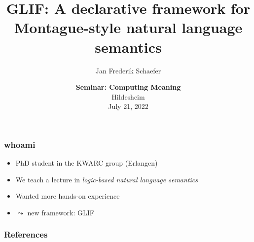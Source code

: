 \documentclass[aspectratio=169]{beamer}
\title{GLIF: A declarative framework for Montague-style natural language semantics}
\author{Jan Frederik Schaefer}
\institute{FAU Erlangen-N\"urnberg/KWARC}
\date{\textbf{Seminar: Computing Meaning}\\Hildesheim\\July 21, 2022}
\begin{document}
\frame\titlepage


\begin{frame}
    \frametitle{whoami}
    \begin{itemize}
        \item PhD student in the KWARC group (Erlangen)
        \item We teach a lecture in \emph{logic-based natural language semantics}
        \item Wanted more hands-on experience
        \item $\leadsto$ new framework: GLIF
    \end{itemize}
\end{frame}

% 



{
    
}

% 
% 
% 
% 
% 
%     
% 
%     
% 
% 
% 
% 
%     

\appendix

\begin{frame}[allowframebreaks,t]
    \frametitle{References}
    \printbibliography
\end{frame}
\end{document}
